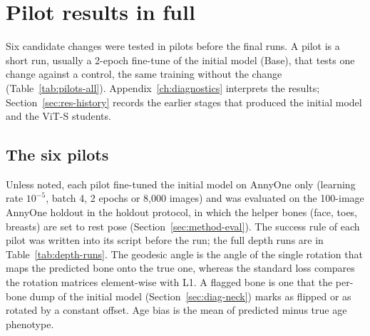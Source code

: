 \chapter{Pilot results in full}
\label{app:pilots}

Six candidate changes were tested in pilots before the final runs. A pilot is a short run, usually a 2-epoch
fine-tune of the initial model (Base), that tests one change against a control, the same training without the change
(Table~\ref{tab:pilots-all}). Appendix~\ref{ch:diagnostics} interprets the results;
Section~\ref{sec:res-history} records the earlier stages that produced the initial model and the ViT-S students.

\section{The six pilots}

Unless noted, each pilot fine-tuned the initial model on AnnyOne only (learning rate $10^{-5}$, batch 4, 2 epochs or
8,000 images) and was evaluated on the 100-image AnnyOne holdout in the holdout protocol, in which the helper bones
(face, toes, breasts) are set to rest pose (Section~\ref{sec:method-eval}). The success rule of each pilot was written into
its script before the run; the full depth runs are in Table~\ref{tab:depth-runs}. The geodesic angle is the angle of
the single rotation that maps the predicted bone onto the true one, whereas the standard loss compares the rotation
matrices element-wise with L1. A flagged bone is one that the per-bone dump of the initial model
(Section~\ref{sec:diag-neck}) marks as flipped or as rotated by a constant offset. Age bias is the mean of predicted
minus true age phenotype.

